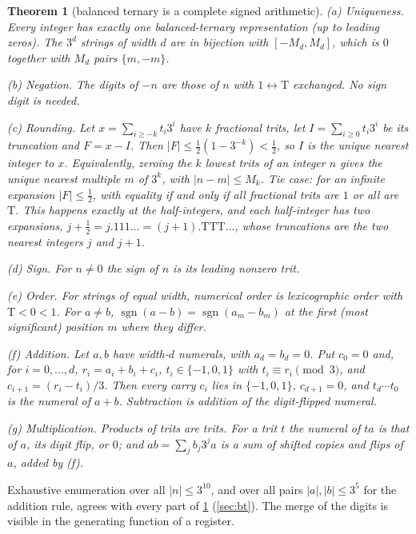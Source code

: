 \documentclass[11pt]{article}
\newtheorem{theorem}{Theorem}[section]
\theoremstyle{definition}\newtheorem{definition}[theorem]{Definition}
\theoremstyle{remark}\newtheorem{remark}[theorem]{Remark}
\newcommand{\T}{\mathrm{T}}
\newcommand{\sgn}{\operatorname{sgn}}
\begin{document}
\begin{theorem}[balanced ternary is a complete signed arithmetic]\label{thm:bt}
\textup{(a) Uniqueness.} Every integer has exactly one balanced-ternary representation (up to leading zeros). The $3^d$ strings of width $d$ are in bijection with $[-M_d,M_d]$, which is $0$ together with $M_d$ pairs $\{m,-m\}$.

\textup{(b) Negation.} The digits of $-n$ are those of $n$ with $1\leftrightarrow\T$ exchanged. No sign digit is needed.

\textup{(c) Rounding.} Let $x=\sum_{i\ge -k}t_i3^i$ have $k$ fractional trits, let $I=\sum_{i\ge0}t_i3^i$ be its truncation and $F=x-I$. Then $|F|\le\frac12(1-3^{-k})<\frac12$, so $I$ is the unique nearest integer to $x$. Equivalently, zeroing the $k$ lowest trits of an integer $n$ gives the unique nearest multiple $m$ of $3^k$, with $|n-m|\le M_k$. \emph{Tie case:} for an infinite expansion $|F|\le\frac12$, with equality if and only if all fractional trits are $1$ or all are $\T$. This happens exactly at the half-integers, and each half-integer has two expansions, $j+\frac12=j.111\ldots=(j{+}1).\T\T\T\ldots$, whose truncations are the two nearest integers $j$ and $j+1$.

\textup{(d) Sign.} For $n\ne0$ the sign of $n$ is its leading nonzero trit.

\textup{(e) Order.} For strings of equal width, numerical order is lexicographic order with $\T<0<1$. For $a\ne b$, $\sgn(a-b)=\sgn(a_m-b_m)$ at the first (most significant) position $m$ where they differ.

\textup{(f) Addition.} Let $a,b$ have width-$d$ numerals, with $a_d=b_d=0$. Put $c_0=0$ and, for $i=0,\dots,d$, $r_i=a_i+b_i+c_i$, $t_i\in\{-1,0,1\}$ with $t_i\equiv r_i\pmod 3$, and $c_{i+1}=(r_i-t_i)/3$. Then every carry $c_i$ lies in $\{-1,0,1\}$, $c_{d+1}=0$, and $t_d\cdots t_0$ is the numeral of $a+b$. Subtraction is addition of the digit-flipped numeral.

\textup{(g) Multiplication.} Products of trits are trits. For a trit $t$ the numeral of $ta$ is that of $a$, its digit flip, or $0$; and $ab=\sum_jb_j3^ja$ is a sum of shifted copies and flips of $a$, added by \textup{(f)}.
\end{theorem}

Exhaustive enumeration over all $|n|\le3^{10}$, and over all pairs $|a|,|b|\le3^5$ for the addition rule, agrees with every part of \cref{thm:bt} (\cref{sec:bt}). The merge of the digits is visible in the generating function of a register.
\end{document}
